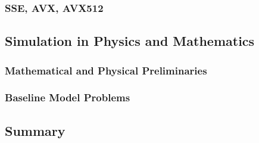 \documentclass{stdlocal}
\begin{document}

    \subsubsection*{SSE, AVX, AVX512} %
    \label{ssub:sse_avx_avx512}


  \subsection{Simulation in Physics and Mathematics} %
  \label{sub:simulation_in_physics_and_mathematics}
    \subsubsection*{Mathematical and Physical Preliminaries} %
    \label{ssub:mathematical_and_physical_preliminaries}


    \subsubsection*{Baseline Model Problems} %
    \label{ssub:baseline_model_problems}


  \subsection{Summary} %
  \label{sub:summary}

\end{document}
